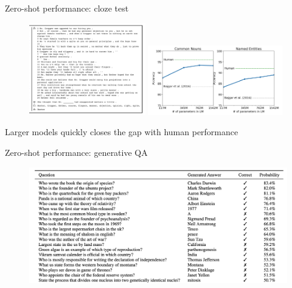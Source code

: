 \documentclass[usenames,dvipsnames,notes,11pt,aspectratio=169,hyperref={colorlinks=true, linkcolor=blue}]{beamer}
\begin{document}
\begin{frame}
    {Zero-shot performance: cloze test}
    \begin{figure}
            \includegraphics[width=0.45\textwidth]{figures/cbt}
            \includegraphics[width=0.52\textwidth]{figures/gpt2-cbt}
    \end{figure}
    Larger models quickly closes the gap with human performance
\end{frame}

\begin{frame}
    {Zero-shot performance: generative QA}
    \begin{figure}
        \includegraphics[width=\textwidth]{figures/gpt2-qa}
    \end{figure}
\end{frame}
\end{document}
